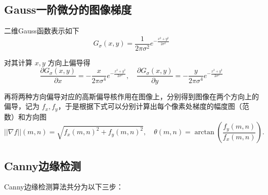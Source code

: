 \documentclass[12pt, a4paper, oneside]{ctexart}
\numberwithin{equation}{section}  %
\begin{document}
\subsection{Gauss一阶微分的图像梯度}

二维Gauss函数表示如下
\[G_{\sigma}(x, y)=\frac{1}{2\pi \sigma^2}e^{-\frac{x^2+y^2}{2\sigma^2}}\]

对其计算 \(x, y\) 方向上偏导得
\[\frac{\partial G_{\sigma}(x, y)}{\partial x}=-\frac{x}{2\pi \sigma^4}e^{-\frac{x^2+y^2}{2\sigma^2}},\quad \frac{\partial G_{\sigma}(x, y)}{\partial y}=-\frac{y}{2\pi \sigma^4}e^{-\frac{x^2+y^2}{2\sigma^2}}\]

再将两种方向偏导对应的高斯偏导核作用在图像上，分别得到图像在两个方向上的偏导，记为
\(f_x, f_y\)，于是根据下式可以分别计算出每个像素处梯度的幅度图（范数）和方向图
\[||\nabla f||(m,n) = \sqrt{f_x(m,n)^2+f_y(m,n)^2},\quad \theta(m,n) = \arctan\left(\frac{f_y(m,n)}{f_x(m,n)}\right).\]

\subsection{Canny边缘检测}

Canny边缘检测算法共分为以下三步：
\end{document}

